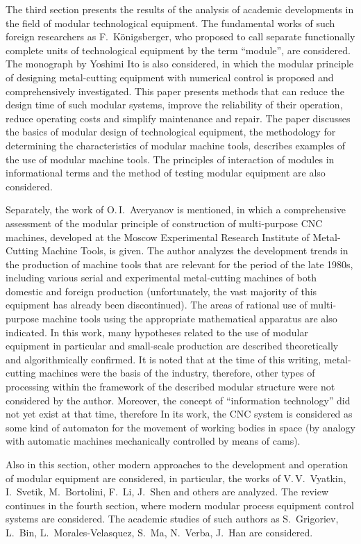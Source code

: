 The third section presents the results of the analysis of academic developments in the field of modular technological equipment. The fundamental works of such foreign researchers as F.~K\"onigsberger, who proposed to call separate functionally complete units of technological equipment by the term ``module'', are considered. The monograph by Yoshimi Ito is also considered, in which the modular principle of designing metal-cutting equipment with numerical control is proposed and comprehensively investigated. This paper presents methods that can reduce the design time of such modular systems, improve the reliability of their operation, reduce operating costs and simplify maintenance and repair. The paper discusses the basics of modular design of technological equipment, the methodology for determining the characteristics of modular machine tools, describes examples of the use of modular machine tools. The principles of interaction of modules in informational terms and the method of testing modular equipment are also considered.

Separately, the work of O.\,I.~Averyanov is mentioned, in which a comprehensive assessment of the modular principle of construction of multi-purpose CNC machines, developed at the Moscow Experimental Research Institute of Metal-Cutting Machine Tools, is given. The author analyzes the development trends in the production of machine tools that are relevant for the period of the late 1980s, including various serial and experimental metal-cutting machines of both domestic and foreign production (unfortunately, the vast majority of this equipment has already been discontinued). The areas of rational use of multi-purpose machine tools using the appropriate mathematical apparatus are also indicated. In this work, many hypotheses related to the use of modular equipment in particular and small-scale production are described theoretically and algorithmically confirmed. It is noted that at the time of this writing, metal-cutting machines were the basis of the industry, therefore, other types of processing within the framework of the described modular structure were not considered by the author. Moreover, the concept of ``information technology'' did not yet exist at that time, therefore In its work, the CNC system is considered as some kind of automaton for the movement of working bodies in space (by analogy with automatic machines mechanically controlled by means of cams).

Also in this section, other modern approaches to the development and operation of modular equipment are considered, in particular, the works of V.\,V.~Vyatkin, I.~Svetik, M.~Bortolini, F.~Li, J.~Shen and others are analyzed. The review continues in the fourth section, where modern modular process equipment control systems are considered. The academic studies of such authors as S.~Grigoriev, L.~Bin, L.~Morales-Velasquez, S.~Ma, N.~Verba, J.~Han are considered.

